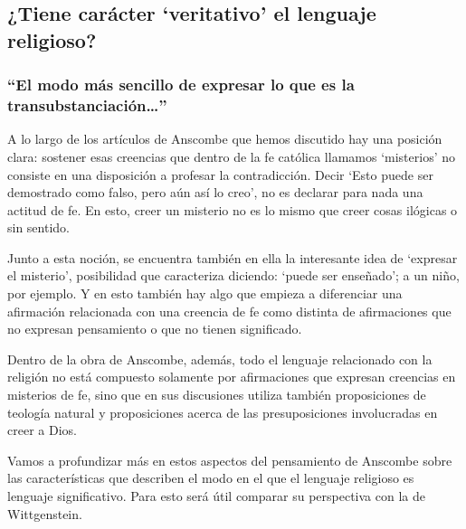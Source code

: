 \subsection{¿Tiene carácter `veritativo' el lenguaje religioso?}

\subsubsection{\enquote{El modo más sencillo de expresar lo que es la transubstanciación\ldots}}

A lo largo de los artículos de Anscombe que hemos discutido hay una posición clara: sostener esas creencias que dentro de la fe católica llamamos `misterios' no consiste en una disposición a profesar la contradicción. Decir \enquote*{Esto puede ser demostrado como falso, pero aún así lo creo}, no es declarar para nada una actitud de fe. En esto, creer un misterio no es lo mismo que creer cosas ilógicas o sin sentido.

Junto a esta noción, se encuentra también en ella la interesante idea de \enquote*{expresar el misterio}, posibilidad que caracteriza diciendo: \enquote*{puede ser enseñado}; a un niño, por ejemplo. Y en esto también hay algo que empieza a diferenciar una afirmación relacionada con una creencia de fe como distinta de afirmaciones que no expresan pensamiento o que no tienen significado.

Dentro de la obra de Anscombe, además, todo el lenguaje relacionado con la religión no está compuesto solamente por afirmaciones que expresan creencias en misterios de fe, sino que en sus discusiones utiliza también proposiciones de teología natural y proposiciones acerca de las presuposiciones involucradas en creer a Dios.

Vamos a profundizar más en estos aspectos del pensamiento de Anscombe sobre las características que describen el modo en el que el lenguaje religioso es lenguaje significativo. Para esto será útil comparar su perspectiva con la de Wittgenstein.

